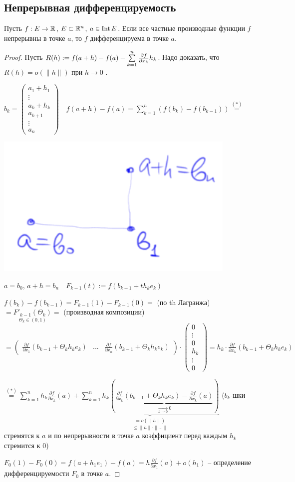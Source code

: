 \subsection{Непрерывная дифференцируемость}

\begin{theorem}
    Пусть $f: E\rightarrow \mathbb{R}$, $E\subset \mathbb{R}^n$, $a\in \operatorname{Int} E$. Если все частные производные функции $f$ непрерывны в точке $a$, то $f$  дифференцируема в точке $a$.
\end{theorem}

\begin{proof}
    Пусть $R(h):=f(a + h) - f(a) - \sum\limits_{k=1}^n\pdv{f}{x_k}(a) h_k$. Надо доказать, что $R(h)=o(\|h\|)$ при $h\rightarrow 0$ .

    $b_k =\begin{pmatrix}
        a_1 + h_1 \\ \vdots \\ a_k + h_k \\ a_{k+1} \\ \vdots \\ a_n
    \end{pmatrix}\quad f(a+h)-f(a)=\sum\limits_{k=1}^n(f(b_k) - f(b_{k-1}))\overset{(*)}{=}$

    \includegraphics[width=0.25\linewidth]{images/24-05-1.png}

    $a=b_0$, $a+h=b_n\quad F_{k-1}(t) := f(b_{k-1} + th_ke_k)$

    $f(b_k) - f(b_{k-1})=F_{k-1}(1)- F_{k-1}(0)=$ (по th Лагранжа) $= \underset{\Theta_k\in (0, 1)}{F'_{k-1}(\Theta_k)}=$ (производная композиции) $=\begin{pmatrix}
    \frac{\partial f}{\partial x_1}(b_{k-1} + \Theta_kh_ke_k) & ... & \frac{\partial f}{\partial x_n}(b_{k-1} + \Theta_kh_ke_k)
    \end{pmatrix}\cdot \begin{pmatrix}
        0 \\ \vdots \\ 0 \\ h_k \\ \vdots \\ 0
    \end{pmatrix}=h_k\cdot \frac{\partial f}{\partial x_k}(b_{k-1} + \Theta_kh_ke_k)$

    $\overset{(*)}{=}\sum\limits_{k=1}^n h_k  \frac{\partial f}{\partial x_k} (a) + \underset{\leq \|h\|\cdot \|... \|}{\underbrace{\sum\limits_{k=1}^n h_k (\underbrace{\frac{\partial f}{\partial x_k}(b_{k-1} + \Theta_kh_ke_k)-\frac{\partial f}{\partial x_k}(a)}_{\underset{h\rightarrow 0}{\rightarrow} 0})}_{=o(\|h\|)}}$ ($b_k$-шки стремятся к $a$ и по непрерывности в точке $a$ коэффициент перед каждым $h_k$ стремится к 0)

    $F_0(1)-F_0(0)= f(a + h_1e_1) - f(a) = h\frac{\partial f}{\partial x_1}(a) + o(h_1)$ – определение дифференцируемости $F_0$ в точке $a$.
\end{proof}

